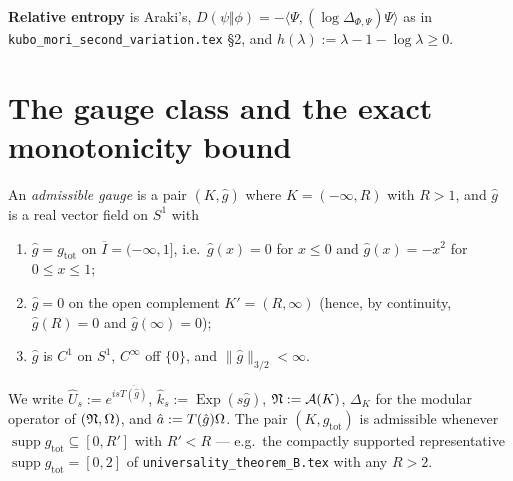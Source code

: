 \documentclass[11pt]{article}
\newcommand{\ip}[2]{\langle#1,#2\rangle}\newcommand{\norm}[1]{\lVert#1\rVert}
\newcommand{\gtot}{g_{\mathrm{tot}}}\newcommand{\ktil}{\tilde k}
\newcommand{\supp}{\operatorname{supp}}\newcommand{\Ad}{\operatorname{Ad}}
\begin{document}
\textbf{Relative entropy} is Araki's, $D(\psi\Vert\phi)=-\ip{\Psi}{(\log\Delta_{\Phi,\Psi})\Psi}$ as in
\texttt{kubo\_mori\_second\_variation.tex} \S2, and $h(\lambda):=\lambda-1-\log\lambda\ge0$.

\section{The gauge class and the exact monotonicity bound}\label{sec:mono}

\begin{definition}\label{def:adm}
An \emph{admissible gauge} is a pair $(K,\hat g)$ where $K=(-\infty,R)$ with $R>1$, and $\hat g$ is a real
vector field on $S^1$ with
\begin{enumerate}[leftmargin=2.4em,label=\textup{(G\arabic*)}]
\item $\hat g=\gtot$ on $\overline I=(-\infty,1]$, i.e.\ $\hat g(x)=0$ for $x\le0$ and $\hat g(x)=-x^2$ for
 $0\le x\le1$;
\item $\hat g=0$ on the open complement $K'=(R,\infty)$ (hence, by continuity, $\hat g(R)=0$ and
 $\hat g(\infty)=0$);
\item $\hat g$ is $C^1$ on $S^1$, $C^\infty$ off $\{0\}$, and $\norm{\hat g}_{3/2}<\infty$.
\end{enumerate}
We write $\hat U_s:=e^{is\overline{T(\hat g)}}$, $\hat k_s:=\operatorname{Exp}(s\hat g)$, $\mathfrak N:=\mathcal A(K)$,
$\Delta_K$ for the modular operator of $(\mathfrak N,\Omega)$, and $\hat a:=T(\hat g)\Omega$.  The pair $(K,\gtot)$ is
admissible whenever $\supp\gtot\subseteq[0,R']$ with $R'<R$ --- e.g.\ the compactly supported representative
$\supp\gtot=[0,2]$ of \texttt{universality\_theorem\_B.tex} with any $R>2$.
\end{definition}
\end{document}
